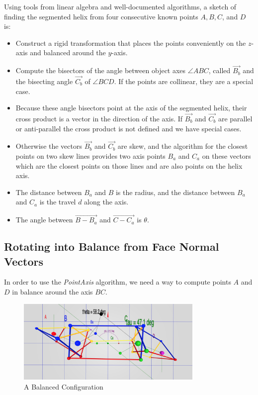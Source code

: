\documentclass{svproc}
\begin{document}
Using tools from linear algebra and well-documented algorithms, a sketch of finding the segmented helix from
four consecutive known points $A,B,C$, and $D$ is:
\begin{itemize}
\item Construct a rigid transformation that places the points conveniently on the $z$-axis and balanced
  around the $y$-axis.
\item Compute the bisectors of the angle between object axes $ \angle{ABC}$, called $\overrightarrow{B_b}$ and the
  bisecting angle $\overrightarrow{C_b}$ of $\angle{BCD}$.
  If the points are collinear, they are a special case.
\item Because these angle bisectors point at the axis of the segmented helix, their cross product is a vector
  in the direction of the axis. If $\overrightarrow{B_b}$ and $\overrightarrow{C_b}$ are parallel or anti-parallel the cross product is not defined
  and we have special cases.
\item  Otherwise the vectors $\overrightarrow{B_b}$ and $\overrightarrow{C_b}$ are skew, and the algorithm for the closest points on
  two skew lines provides two axis points $B_a$ and $C_a$ on these vectors which
  are the closest points on those lines and are also points on the helix axis.
\item The distance between $B_a$ and $B$ is the radius, and the distance between $B_a$ and $C_a$ is the travel $d$ along the axis.
  \item The angle between $\overrightarrow{B - B_a}$ and $\overrightarrow{C - C_a}$ is $\theta$.
\end{itemize}

\subsection{Rotating into Balance from Face Normal Vectors}

\label{sec:balance}



In order to use the {\em PointAxis} algorithm, we need a way
to compute points $A$ and $D$ in balance around the axis $BC$.

\begin{figure}
     \centering
     \includegraphics[width=0.80\textwidth]{figures/Balance.png}
     \caption{A Balanced Configuration}
  \label{fig:balancediagram}
\end{figure}
\end{document}
